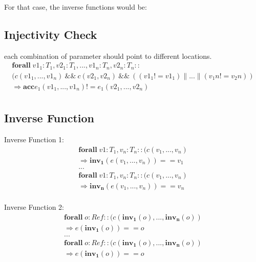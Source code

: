 \documentclass[12pt]{article}
\begin{document}
For that case, the inverse functions would be:

\subsection{Injectivity Check}
each combination of parameter should point to different locations.
\begin{equation}
\begin{aligned}
	\mathbf{forall} \; v1_1:T_1, v2_1:T_1, ..., v1_n:T_n, v2_n:T_n  :: \\
	(c(v1_1,..., v1_n) \:\&\&\:  c(v2_1, v2_n)  \:\&\&\:  ((v1_1 != v1_1) \| ... \| (v_1n != v_2n)) \\
 	\Rightarrow \mathbf{acc} e_1(v1_1,..., v1_n)  != e_1(v2_1,..., v2_n) \\
\end{aligned}
\end{equation}

\subsection{Inverse Function}
Inverse Function 1:
\begin{equation}
\begin{aligned}
\mathbf{forall} \; v1:T_1,  v_n:T_n  :: (c(v_1,..., v_n) \\
\Rightarrow \mathbf{inv_1}(e(v_1,..., v_n))  == v_1 \\
... \\
\mathbf{forall} \; v1:T_1,  v_n:T_n  :: (c(v_1,..., v_n) \\
 \Rightarrow \mathbf{inv_n}(e(v_1,..., v_n))  == v_n \\
\end{aligned}
\end{equation}

Inverse Function 2:
\begin{equation}
\begin{aligned}
\mathbf{forall} \; o:Ref  :: (c( \mathbf{inv_1}(o), ...,  \mathbf{inv_n}(o)) \\
 \Rightarrow e(\mathbf{inv_1}(o))  == o \\
...\\
\mathbf{forall} \; o:Ref  :: (c( \mathbf{inv_1}(o), ...,  \mathbf{inv_n}(o))\\
 \Rightarrow e(\mathbf{inv_1}(o))  == o 
\end{aligned}
\end{equation}
\end{document}

